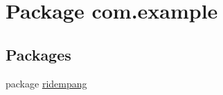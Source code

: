 \hypertarget{namespacecom_1_1example}{\section{Package com.\-example}
\label{namespacecom_1_1example}
}
\subsection*{Packages}
\begin{DoxyCompactItemize}
\item 
package \hyperlink{namespacecom_1_1example_1_1ridempang}{ridempang}
\end{DoxyCompactItemize}
